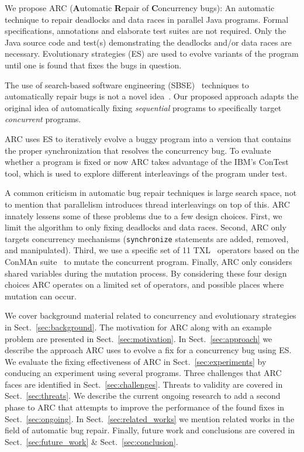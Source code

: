 \documentclass{llncs}
\begin{document}
We propose ARC (\textbf{A}utomatic \textbf{R}epair of \textbf{C}oncurrency
bugs): An automatic technique to repair deadlocks and data races in parallel
Java programs. Formal specifications, annotations and elaborate test suites are
not required. Only the Java source code and test(s) demonstrating the deadlocks
and/or data races are necessary. Evolutionary strategies (ES) are used to evolve
variants of the program until one is found that fixes the bugs in question.

The use of search-based software engineering (SBSE)~\cite{Har+10} techniques to
automatically repair bugs is not a novel idea~\cite{FNWG09, AY08, Arc08, WT10,
WNLF09, WFGN10}. Our proposed approach adapts the original idea of
automatically fixing \textit{sequential} programs to specifically target
\textit{concurrent} programs.

ARC uses ES to iteratively evolve a buggy program into a version that contains
the proper synchronization that resolves the concurrency bug. To evaluate
whether a program is fixed or now ARC takes advantage of the IBM's
ConTest~\cite{EFN+02} tool, which is used to explore different interleavings of
the program under test.

A common criticism in automatic bug repair techniques is large search space,
not to mention that parallelism introduces thread interleavings on top of this.
ARC innately lessens some of these problems due to a few design choices. First,
we limit the algorithm to only fixing deadlocks and data races. Second, ARC
only targets concurrency mechanisms (\texttt{synchronize} statements are added,
removed, and manipulated). Third, we use a specific set of 11
TXL~\cite{CHP91} operators based on the ConMAn suite~\cite{BCD06} to mutate the
concurrent program.  Finally, ARC only considers shared variables during the
mutation process. By considering these four design choices ARC operates on a
limited set of operators, and possible places where mutation can occur.

We cover background material related to concurrency and evolutionary strategies
in Sect.~\ref{sec:background}. The motivation for ARC along with an example
problem are presented in Sect.~\ref{sec:motivation}. In
Sect.~\ref{sec:approach} we describe the approach ARC uses to evolve a fix for
a concurrency bug using ES. We evaluate the fixing effectiveness of ARC in
Sect.~\ref{sec:experiments} by conducing an experiment using several programs.
Three challenges that ARC faces are identified in Sect.~\ref{sec:challenges}.
Threats to validity are covered in Sect.~\ref{sec:threats}. We describe the current
ongoing research to add a second phase to ARC that attempts to improve the
performance of the found fixes in Sect.~\ref{sec:ongoing}. In
Sect.~\ref{sec:related_works} we mention related works in the field of
automatic bug repair. Finally, future work and conclusions are covered in
Sect.~\ref{sec:future_work} \& Sect.~\ref{sec:conclusion}.
\end{document}
